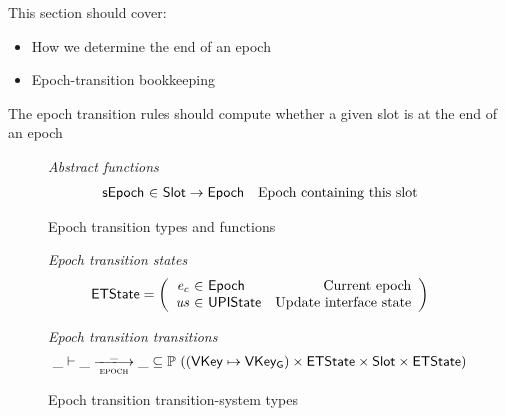 \documentclass[11pt,a4paper]{article}
\newcommand{\powerset}[1]{\mathbb{P}~#1}
\newcommand{\var}[1]{\mathit{#1}}
\newcommand{\fun}[1]{\mathsf{#1}}
\newcommand{\type}[1]{\mathsf{#1}}
\newcommand{\trans}[2]{\xlongrightarrow[\textsc{#1}]{#2}}
\newcommand{\totalf}{\to}
\newcommand{\Slot}{\type{Slot}}
\newcommand{\VKey}{\type{VKey}}
\newcommand{\VKeyGen}{\type{VKey_G}}
\begin{document}
\newcommand{\sepochname}{sEpoch}
\newcommand{\sepoch}[1]{\fun{\sepochname}\ #1}

This section should cover:
\begin{itemize}
\item How we determine the end of an epoch
\item Epoch-transition bookkeeping
\end{itemize}

The epoch transition rules should compute whether a given slot is at the end of
an epoch
\begin{figure}[ht]
  \emph{Abstract functions}
  \begin{equation*}
    \begin{array}{r@{~\in~}lr}
      \fun{\sepochname} & \Slot \totalf \Epoch & \text{Epoch containing this slot} \\
    \end{array}
  \end{equation*}
  \caption{Epoch transition types and functions}
  \label{fig:defs:epoch}
\end{figure}

\begin{figure}[ht]

  \emph{Epoch transition states}
  \begin{equation*}
    \ETState =
    \left(
      \begin{array}{r@{~\in~}lr}
        \var{e_c} & \Epoch & \text{Current epoch} \\
        \var{us} & \UPIState & \text{Update interface state}
      \end{array}
    \right)
  \end{equation*}

  \emph{Epoch transition transitions}
  \begin{equation*}
    \_ \vdash \var{\_} \trans{epoch}{\_} \var{\_} \subseteq
    \powerset ((\VKey \mapsto \VKeyGen) \times \ETState \times \Slot \times \ETState)
  \end{equation*}
  \caption{Epoch transition transition-system types}
  \label{fig:ts-types:epoch}
\end{figure}
\end{document}
